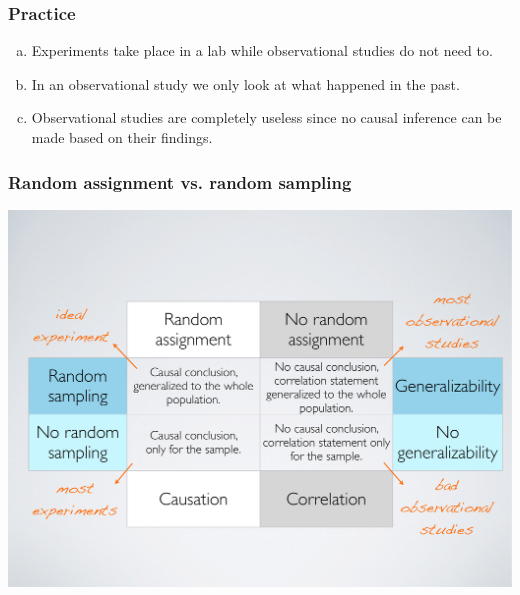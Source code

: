 \begin{frame}
\frametitle{Practice}


\begin{enumerate}[(a)]
\item Experiments take place in a lab while observational studies do not need to.
\item In an observational study we only look at what happened in the past.
\item Observational studies are completely useless since no causal inference can be made based on their findings.
\end{enumerate}

\end{frame}


\begin{frame}
\frametitle{Random assignment vs. random sampling}

\begin{center}
\includegraphics[width=\textwidth]{1-4_experiments/figures/random_sample_assignment}
\end{center}

\end{frame}

